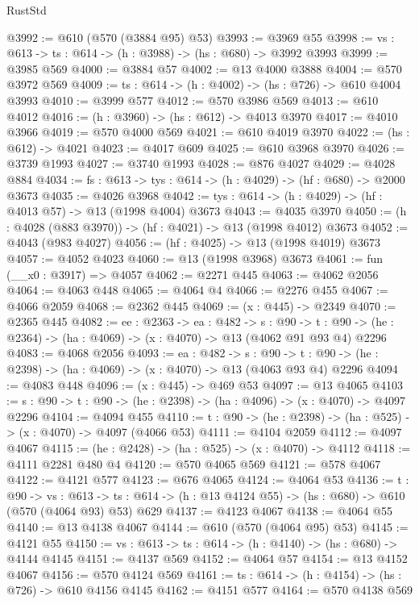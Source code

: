\begin{lexlean}{RustStd}
\begin{coremodule}
@3992 := @610 (@570 (@3884 @95) @53)
@3993 := @3969 @55
@3998 := {vs : @613} -> {ts : @614} -> (h : @3988) -> (hs : @680) -> @3992 @3993
@3999 := @3985 @569
@4000 := @3884 @57
@4002 := @13 @4000 @3888
@4004 := @570 @3972 @569
@4009 := {ts : @614} -> (h : @4002) -> (hs : @726) -> @610 @4004 @3993
@4010 := @3999 @577
@4012 := @570 @3986 @569
@4013 := @610 @4012
@4016 := (h : @3960) -> (hs : @612) -> @4013 @3970
@4017 := @4010 @3966
@4019 := @570 @4000 @569
@4021 := @610 @4019 @3970
@4022 := (hs : @612) -> @4021
@4023 := @4017 @609
@4025 := @610 @3968 @3970
@4026 := @3739 @1993
@4027 := @3740 @1993
@4028 := @876 @4027
@4029 := @4028 @884
@4034 := {fs : @613} -> {tys : @614} -> (h : @4029) -> (hf : @680) -> @2000 @3673
@4035 := @4026 @3968
@4042 := {tys : @614} -> (h : @4029) -> (hf : @4013 @57) -> @13 (@1998 @4004) @3673
@4043 := @4035 @3970
@4050 := (h : @4028 (@883 @3970)) -> (hf : @4021) -> @13 (@1998 @4012) @3673
@4052 := @4043 (@983 @4027)
@4056 := (hf : @4025) -> @13 (@1998 @4019) @3673
@4057 := @4052 @4023
@4060 := @13 (@1998 @3968) @3673
@4061 := fun (__x0 : @3917) => @4057
@4062 := @2271 @445
@4063 := @4062 @2056
@4064 := @4063 @448
@4065 := @4064 @4
@4066 := @2276 @455
@4067 := @4066 @2059
@4068 := @2362 @445
@4069 := (x : @445) -> @2349
@4070 := @2365 @445
@4082 := {ee : @2363} ->
  {ea : @482} ->
  {s : @90} ->
  {t : @90} -> (he : @2364) -> (ha : @4069) -> (x : @4070) -> @13 (@4062 @91 @93 @4) @2296
@4083 := @4068 @2056
@4093 := {ea : @482} ->
  {s : @90} -> {t : @90} -> (he : @2398) -> (ha : @4069) -> (x : @4070) -> @13 (@4063 @93 @4) @2296
@4094 := @4083 @448
@4096 := (x : @445) -> @469 @53
@4097 := @13 @4065
@4103 := {s : @90} -> {t : @90} -> (he : @2398) -> (ha : @4096) -> (x : @4070) -> @4097 @2296
@4104 := @4094 @455
@4110 := {t : @90} -> (he : @2398) -> (ha : @525) -> (x : @4070) -> @4097 (@4066 @53)
@4111 := @4104 @2059
@4112 := @4097 @4067
@4115 := (he : @2428) -> (ha : @525) -> (x : @4070) -> @4112
@4118 := @4111 @2281 @480 @4
@4120 := @570 @4065 @569
@4121 := @578 @4067
@4122 := @4121 @577
@4123 := @676 @4065
@4124 := @4064 @53
@4136 := {t : @90} ->
  {vs : @613} ->
  {ts : @614} -> (h : @13 @4124 @55) -> (hs : @680) -> @610 (@570 (@4064 @93) @53) @629
@4137 := @4123 @4067
@4138 := @4064 @55
@4140 := @13 @4138 @4067
@4144 := @610 (@570 (@4064 @95) @53)
@4145 := @4121 @55
@4150 := {vs : @613} -> {ts : @614} -> (h : @4140) -> (hs : @680) -> @4144 @4145
@4151 := @4137 @569
@4152 := @4064 @57
@4154 := @13 @4152 @4067
@4156 := @570 @4124 @569
@4161 := {ts : @614} -> (h : @4154) -> (hs : @726) -> @610 @4156 @4145
@4162 := @4151 @577
@4164 := @570 @4138 @569

\end{coremodule}
\end{lexlean}
